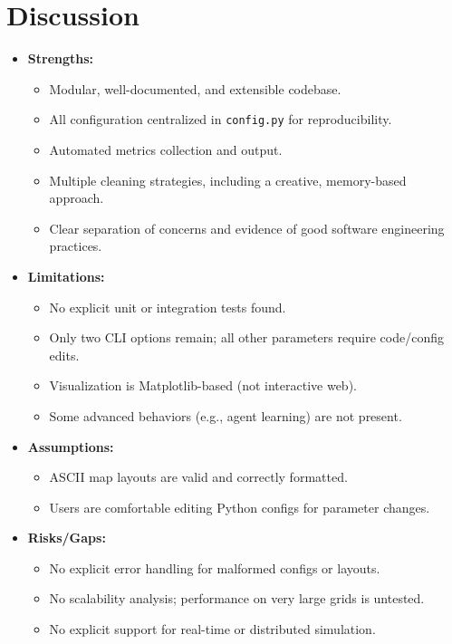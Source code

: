 \documentclass[12pt,a4paper]{article}
\begin{document}
\section*{Discussion}
\begin{itemize}
    \item \textbf{Strengths:}
    \begin{itemize}
        \item Modular, well-documented, and extensible codebase.
        \item All configuration centralized in \texttt{config.py} for reproducibility.
        \item Automated metrics collection and output.
        \item Multiple cleaning strategies, including a creative, memory-based approach.
        \item Clear separation of concerns and evidence of good software engineering practices.
    \end{itemize}
    \item \textbf{Limitations:}
    \begin{itemize}
        \item No explicit unit or integration tests found.
        \item Only two CLI options remain; all other parameters require code/config edits.
        \item Visualization is Matplotlib-based (not interactive web).
        \item Some advanced behaviors (e.g., agent learning) are not present.
    \end{itemize}
    \item \textbf{Assumptions:}
    \begin{itemize}
        \item ASCII map layouts are valid and correctly formatted.
        \item Users are comfortable editing Python configs for parameter changes.
    \end{itemize}
    \item \textbf{Risks/Gaps:}
    \begin{itemize}
        \item No explicit error handling for malformed configs or layouts.
        \item No scalability analysis; performance on very large grids is untested.
        \item No explicit support for real-time or distributed simulation.
    \end{itemize}

\end{itemize}
\end{document}
